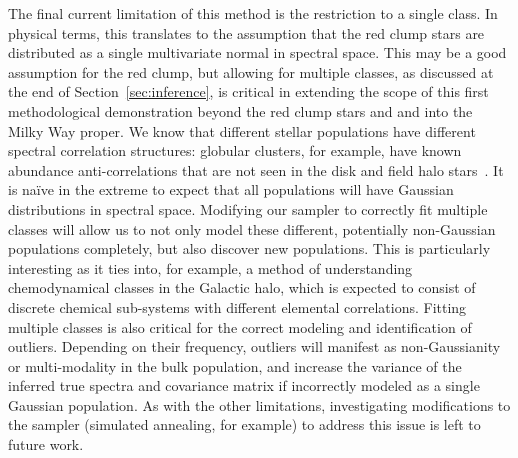 \documentclass[a4paper,fleqn,usenatbib]{mnras}
\newcommand{\mkn}[1]{\textbf{\textcolor{red}{MKN: #1}}}
\begin{document}
The final current limitation of this method is the restriction to a single class. In physical terms, this translates to the assumption that the red clump stars are distributed as a single multivariate normal in spectral space. This may be a good assumption for the red clump, but allowing for multiple classes, as discussed at the end of Section~\ref{sec:inference}, is critical in extending the scope of this first methodological demonstration beyond the red clump stars and and into the Milky Way proper. We know that different stellar populations have different spectral correlation structures: globular clusters, for example, have known abundance anti-correlations that are not seen in the disk and field halo stars~\citep[e.g.][]{Kraft1997, Gratton2015, Pan2017, Carr2019}. It is na\"ive in the extreme to expect that all populations will have Gaussian distributions in spectral space. Modifying our sampler to correctly fit multiple classes will allow us to not only model these different, potentially non-Gaussian populations completely, but also discover new populations. This is particularly interesting as it ties into, for example, a method of understanding chemodynamical classes in the Galactic halo, which is expected to consist of discrete chemical sub-systems with different elemental correlations. Fitting multiple classes is also critical for the correct modeling and identification of outliers. Depending on their frequency, outliers will manifest as non-Gaussianity or multi-modality in the bulk population, and increase the variance of the inferred true spectra and covariance matrix if incorrectly modeled as a single Gaussian population. As with the other limitations, investigating modifications to the sampler (simulated annealing, for example) to address this issue is left to future work.

 
\end{document}
